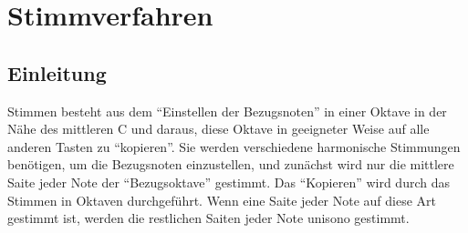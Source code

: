 
\section{Stimmverfahren}
\label{c2_6}

\subsection{Einleitung}
\label{c2_6a}

Stimmen besteht aus dem \enquote{Einstellen der Bezugsnoten} in einer Oktave in der Nähe des mittleren C und daraus, diese Oktave in geeigneter Weise auf alle anderen Tasten zu \enquote{kopieren}.
Sie werden verschiedene harmonische Stimmungen benötigen, um die Bezugsnoten einzustellen, und zunächst wird nur die mittlere Saite jeder Note der \enquote{Bezugsoktave} gestimmt.
Das \enquote{Kopieren} wird durch das Stimmen in Oktaven durchgeführt.
Wenn eine Saite jeder Note auf diese Art gestimmt ist, werden die restlichen Saiten jeder Note unisono gestimmt.

